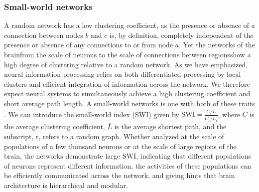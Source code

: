\documentclass[twocolumn]{article}
\begin{document}
\subsubsection{Small-world networks}
A random network has a low clustering coefficient, as the presence or absence of a connection between nodes $b$ and $c$ is, by definition, completely independent of the presence or absence of any connections to or from node $a$. Yet the networks of the brain\textemdash from the scale of neurons to the scale of connections between regions\textemdash show a high degree of clustering relative to a random network. As we have emphasized, neural information processing relies on both differentiated processing by local clusters and efficient integration of information across the network. We therefore expect neural systems to simultaneously achieve a high clustering coefficient and short average path length. A small-world networks is one with both of these traits \cite{wast1998}. We can introduce the small-world index (SWI) \cite{hugu2008} given by  $\mathrm{SWI} = \frac{\bar{C}/\bar{L}}{\bar{C}_{\mathrm{r}}/\bar{L}_{\mathrm{r}}}$, where $\bar{C}$ is the average clustering coefficient, $\bar{L}$ is the average shortest path, and the subscript, $\mathrm{r}$, refers to a random graph. Whether analyzed at the scale of populations of a few thousand neurons or at the scale of large regions of the brain, the networks demonstrate large $\mathrm{SWI}$, indicating that different populations of neurons represent different information, the activities of these populations can be efficiently communicated across the network, and  giving hints that brain architecture is hierarchical and modular.
\end{document}

